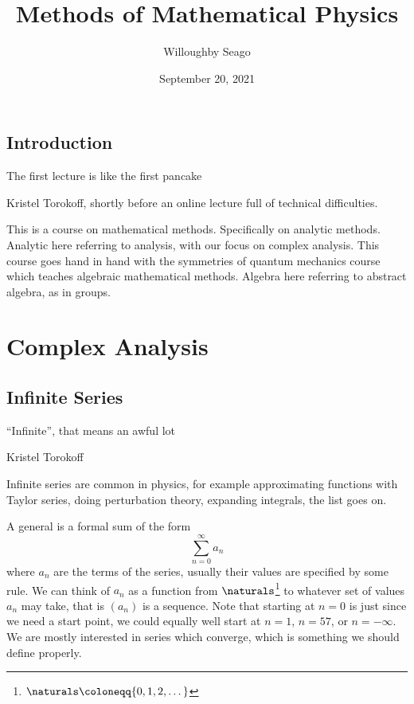 \documentclass[fleqn]{NotesClass}
\title{Methods of Mathematical Physics}
\author{Willoughby Seago}
\date{September 20, 2021}
\begin{document}
    \frontmatter
    \titlepage
    \tableofcontents
    \mainmatter
    
    \chapter{Introduction}
    \epigraph{The first lecture is like the first pancake}{Kristel Torokoff, shortly before an online lecture full of technical difficulties.}
    This is a course on mathematical methods.
    Specifically on analytic methods.
    Analytic here referring to analysis, with our focus on complex analysis.
    This course goes hand in hand with the symmetries of quantum mechanics course which teaches algebraic mathematical methods.
    Algebra here referring to abstract algebra, as in groups.
    
    \part{Complex Analysis}
    
    \chapter{Infinite Series}
    \epigraph{\enquote{Infinite}, that means an awful lot}{Kristel Torokoff}
    Infinite series are common in physics, for example approximating functions with Taylor series, doing perturbation theory, expanding integrals, the list goes on.
    
    A general  is a formal sum of the form
    \begin{equation}
        \sum_{n=0}^{\infty} a_n
    \end{equation}
    where \(a_n\) are the terms of the series, usually their values are specified by some rule.
    We can think of \(a_n\) as a function from \(\naturals\)\footnote{\(\naturals \coloneqq \{0, 1, 2, \dotsc\}\)} to whatever set of values \(a_n\) may take, that is \((a_n)\) is a sequence.
    Note that starting at \(n = 0\) is just since we need a start point, we could equally well start at \(n = 1\), \(n = 57\), or \(n = -\infty\).
    We are mostly interested in series which converge, which is something we should define properly.
    
\end{document}

